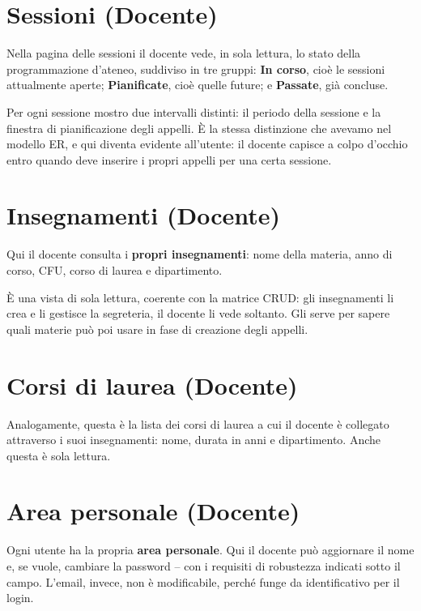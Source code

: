 \documentclass[11pt]{article}
\begin{document}
\section*{Sessioni (Docente)}

Nella pagina delle sessioni il docente vede, in sola lettura, lo stato della
programmazione d'ateneo, suddiviso in tre gruppi: \textbf{In corso}, cioè le sessioni
attualmente aperte; \textbf{Pianificate}, cioè quelle future; e \textbf{Passate}, già
concluse.

Per ogni sessione mostro due intervalli distinti: il periodo della sessione e la finestra
di pianificazione degli appelli. È la stessa distinzione che avevamo nel modello ER, e
qui diventa evidente all'utente: il docente capisce a colpo d'occhio entro quando deve
inserire i propri appelli per una certa sessione.

\section*{Insegnamenti (Docente)}

Qui il docente consulta i \textbf{propri insegnamenti}: nome della materia, anno di
corso, CFU, corso di laurea e dipartimento.

È una vista di sola lettura, coerente con la matrice CRUD: gli insegnamenti li crea e li
gestisce la segreteria, il docente li vede soltanto. Gli serve per sapere quali materie
può poi usare in fase di creazione degli appelli.

\section*{Corsi di laurea (Docente)}

Analogamente, questa è la lista dei corsi di laurea a cui il docente è collegato
attraverso i suoi insegnamenti: nome, durata in anni e dipartimento. Anche questa è
sola lettura.

\section*{Area personale (Docente)}

Ogni utente ha la propria \textbf{area personale}. Qui il docente può aggiornare il
nome e, se vuole, cambiare la password -- con i requisiti di robustezza indicati sotto
il campo. L'email, invece, non è modificabile, perché funge da identificativo per il
login.
\end{document}
